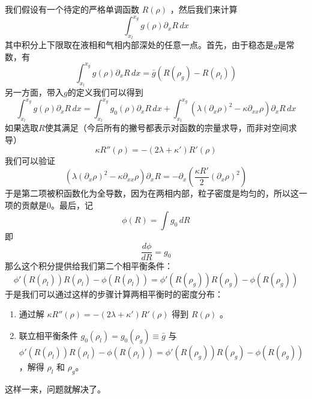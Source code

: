\documentclass{ctexart}
\begin{document}
我们假设有一个待定的严格单调函数 $R(\rho)$ ，然后我们来计算
\begin{equation}
\int_{x_l}^{x_g}g(\rho)\partial_xR\,dx
\end{equation}
其中积分上下限取在液相和气相内部深处的任意一点。首先，由于稳态是$g$是常数，有
\begin{equation}
\int_{x_l}^{x_g}g(\rho)\partial_xR\,dx=\bar{g}(R(\rho_g)-R(\rho_l))
\end{equation}
另一方面，带入$g$的定义我们可以得到
\begin{equation}
\int_{x_l}^{x_g}g(\rho)\partial_xR\,dx=\int_{x_l}^{x_g}g_0(\rho)\partial_xR\,dx+\int_{x_l}^{x_g}(\lambda(\partial_x\rho)^2-\kappa\partial_{xx}\rho)\partial_xR \,dx
\end{equation}
如果选取$R$使其满足（今后所有的撇号都表示对函数的宗量求导，而非对空间求导）
\begin{equation}
\kappa R''(\rho)=-(2\lambda+\kappa')R'(\rho)
\end{equation}
我们可以验证
\begin{equation}
(\lambda(\partial_x\rho)^2-\kappa\partial_{xx}\rho)\partial_xR=-\partial_x\left(\frac{\kappa R'}{2}(\partial_x\rho)^2\right)
\end{equation}
于是第二项被积函数化为全导数，因为在两相内部，粒子密度是均匀的，所以这一项的贡献是0。最后，记
\begin{equation}
\phi(R)=\int g_0\, dR
\end{equation}
即
\begin{equation}
\frac{d\phi}{d R}=g_0
\end{equation}
那么这个积分提供给我们第二个相平衡条件：
\begin{equation}
\phi'(R(\rho_l))R(\rho_l)-\phi(R(\rho_l))=\phi'(R(\rho_g))R(\rho_g)-\phi(R(\rho_g))
\end{equation}
于是我们可以通过这样的步骤计算两相平衡时的密度分布：
\begin{enumerate}
\item 通过解 $\kappa R''(\rho)=-(2\lambda+\kappa')R'(\rho)$ 得到 $R(\rho)$ 。
\item 联立相平衡条件 $g_0(\rho_l)=g_0(\rho_g)\equiv\bar{g}$ 与 $\phi'(R(\rho_l))R(\rho_l)-\phi(R(\rho_l))=\phi'(R(\rho_g))R(\rho_g)-\phi(R(\rho_g))$ ，解得 $\rho_l$ 和 $\rho_g$。
\end{enumerate}
这样一来，问题就解决了。
\end{document}
